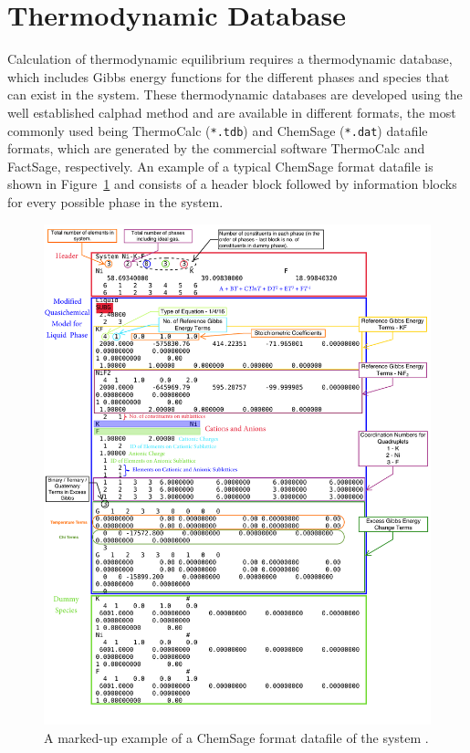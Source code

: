 \section{Thermodynamic Database}
	Calculation of thermodynamic equilibrium requires a thermodynamic database, which includes Gibbs energy functions for the different phases and species that can exist in the system. These thermodynamic databases are developed using the well established \gls{calphad} method \cite{Kaufman:1970aa} and are available in different formats, the most commonly used being ThermoCalc (\texttt{*.tdb}) and ChemSage (\texttt{*.dat}) datafile formats, which are generated by the commercial software ThermoCalc and FactSage, respectively. An example of a typical ChemSage format datafile is shown in Figure~\ref{fig:datfile} and consists of a header block followed by information blocks for every possible phase in the system.
	\begin{figure}[htbp]
	 	\centering
	   	\includegraphics[width=\textwidth]{figures/chapter-6/NiKF.pdf}
	   	\caption[A marked-up example of a ChemSage format datafile of the  system.]{A marked-up example of a ChemSage format datafile of the  system \cite{OcadizFlores18}.}
	   	\label{fig:datfile}
	\end{figure}

